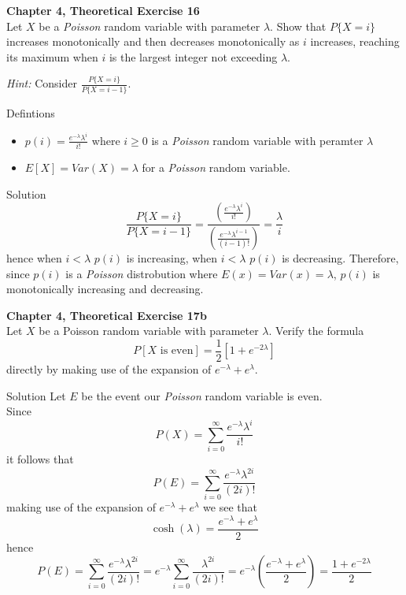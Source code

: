 \documentclass{article}
\begin{document}
\begin{spacing}{1.1}
\newpage
\begin{homeworkProblem}
  {\bf Chapter 4, Theoretical Exercise 16}\\
  Let $X$ be a \emph{Poisson} random variable with parameter $\lambda$. 
  Show that $P\{ X = i\}$ increases monotonically and then decreases 
  monotonically as $i$ increases, reaching its maximum when $i$ is the 
  largest integer not exceeding $\lambda$.

  \emph{Hint:} Consider $\frac{ P\{ X = i\}}{ P\{ X = i - 1\}}$.
  \begin{homeworkSection}{Defintions}
    \begin{itemize}
      \item $p( i) = \frac{ e^{-\lambda} \lambda^i}{ i!}$ where 
        $i \ge 0$ is a \emph{Poisson} random variable with peramter $\lambda$ 
      \item $E[ X] = Var( X) = \lambda$ for a \emph{Poisson} random variable.
    \end{itemize}
  \end{homeworkSection}
 \begin{homeworkSection}{Solution}
    \[\frac{ P\{ X = i\}}{ P\{ X = i - 1\}} 
    = \frac{ \left(\frac{ e^{-\lambda} \lambda^i}{ i!}\right)}
          { \left(\frac{ e^{-\lambda} \lambda^{i - 1}}{ (i - 1)!}\right)}
    = \frac{ \lambda}{ i}\]
    hence when $i < \lambda$ $p( i)$ is increasing, when $ i < \lambda$ $p( i)$ is decreasing.
    Therefore, since $p( i)$ is a \emph{Poisson} distrobution where $E( x) = Var( x) = \lambda$,
    $p( i)$ is monotonically increasing and decreasing.
  \end{homeworkSection}
\end{homeworkProblem}

\newpage
\begin{homeworkProblem}
  {\bf Chapter 4, Theoretical Exercise 17b}\\
  Let $X$ be a Poisson random variable with parameter $\lambda$.
  Verify the formula
  \[P[ X \text{ is even}] = \frac{ 1}{ 2} \left[1 + e^{-2 \lambda}\right]\]
  directly by making use of the expansion of $e^{-\lambda} + e^{\lambda}$.
 \begin{homeworkSection}{Solution}
    Let $E$ be the event our \emph{Poisson} random variable is even.\\
    Since
    \[P( X) = \sum\limits_{i = 0}^{\infty}{ \frac{ e^{-\lambda} \lambda^{i}}{ i!}}\]
    it follows that
    \[P( E) = \sum\limits_{i = 0}^{\infty}{ \frac{e^{-\lambda} \lambda^{2 i}}{ (2 i)!}}\]
    making use of the expansion of $e^{-\lambda} + e^{\lambda}$ we see that 
    \[\cosh( \lambda) = \frac{ e^{-\lambda} + e^{\lambda}}{ 2}\]
    hence
    \[P( E) = \sum\limits_{i = 0}^{\infty}{ \frac{e^{-\lambda} \lambda^{2 i}}{ (2 i)!}}
    = e^{-\lambda} \sum\limits_{i = 0}^{\infty}{ \frac{ \lambda^{2 i}}{ (2 i)!}}
    = e^{-\lambda} \left(\frac{ e^{-\lambda} + e^{\lambda}}{ 2}\right) = \frac{ 1 + e^{-2 \lambda}}{ 2}\]
  \end{homeworkSection}
\end{homeworkProblem}


\end{spacing}
\end{document}

